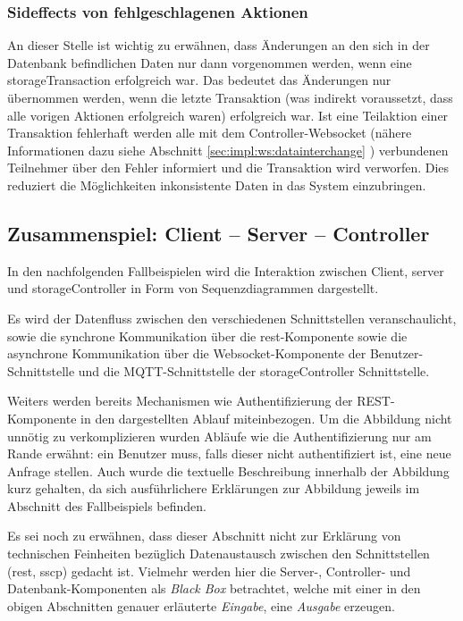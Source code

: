 \subsubsection{Sideffects von fehlgeschlagenen Aktionen}\label{sec:impl:sideeffects}
An dieser Stelle ist wichtig zu erwähnen, dass Änderungen an den sich in der Datenbank befindlichen Daten nur dann vorgenommen werden, wenn eine \gls{storageTransaction} erfolgreich war. Das bedeutet das Änderungen nur übernommen werden, wenn die letzte Transaktion (was indirekt voraussetzt, dass alle vorigen Aktionen erfolgreich waren) erfolgreich war. Ist eine Teilaktion einer Transaktion fehlerhaft werden alle mit dem Controller-Websocket (nähere Informationen dazu siehe Abschnitt \ref{sec:impl:ws:datainterchange} ) verbundenen Teilnehmer über den Fehler informiert und die Transaktion wird verworfen. Dies reduziert die Möglichkeiten inkonsistente Daten in das System einzubringen. %


\subsection{Zusammenspiel: Client -- Server -- Controller}
In den nachfolgenden Fallbeispielen wird die Interaktion zwischen Client, \gls{server} und \gls{storageController} in Form von Sequenzdiagrammen dargestellt.\bigskip

\noindent
Es wird der Datenfluss zwischen den verschiedenen Schnittstellen veranschaulicht, sowie die synchrone Kommunikation über die \acrshort{rest}-Komponente sowie die asynchrone Kommunikation über die Websocket-Komponente der Benutzer-Schnittstelle und die MQTT-Schnittstelle der \gls{storageController} Schnittstelle.\bigskip

\noindent
Weiters werden bereits Mechanismen wie Authentifizierung der REST-Komponente in den dargestellten Ablauf miteinbezogen. Um die Abbildung nicht unnötig zu verkomplizieren wurden Abläufe wie die Authentifizierung nur am Rande erwähnt: ein Benutzer muss, falls dieser nicht authentifiziert ist, eine neue Anfrage stellen. Auch wurde die textuelle Beschreibung innerhalb der Abbildung kurz gehalten, da sich ausführlichere Erklärungen zur Abbildung jeweils im Abschnitt des Fallbeispiels befinden.\bigskip

\noindent
Es sei noch zu erwähnen, dass dieser Abschnitt nicht zur Erklärung von technischen Feinheiten bezüglich Datenaustausch zwischen den Schnittstellen (\acrshort{rest}, \acrshort{sscp}) gedacht ist. Vielmehr werden hier die Server-, Controller- und Datenbank-Komponenten als \textit{Black Box} betrachtet, welche mit einer in den obigen Abschnitten genauer erläuterte \textit{Eingabe}, eine \textit{Ausgabe} erzeugen.    


